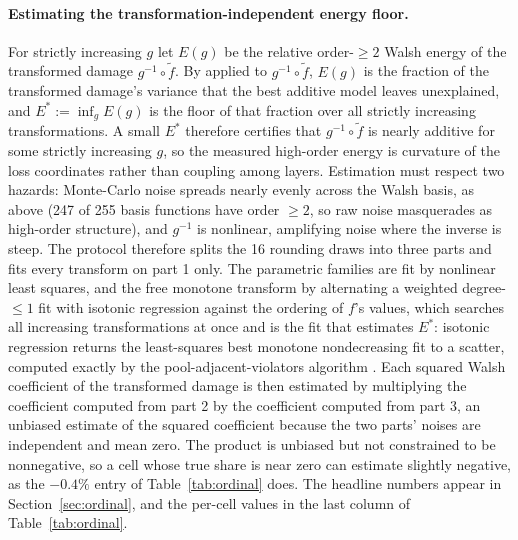 \paragraph{Estimating the transformation-independent energy floor.} For strictly increasing $g$ let $E(g)$
be the relative order-$\ge 2$ Walsh energy of the transformed damage $g^{-1}\circ \tilde f$. By \thmone{}
applied
to $g^{-1}\circ \tilde f$, $E(g)$ is the fraction of the transformed damage's variance that the best additive
model leaves unexplained, and $E^* := \inf_g E(g)$ is the floor of that fraction over all strictly
increasing transformations. A small $E^*$
therefore certifies that $g^{-1}\circ \tilde f$ is nearly additive for some strictly increasing $g$, so the
measured high-order energy is curvature of the loss coordinates rather than coupling among layers.
Estimation must respect two hazards: Monte-Carlo noise spreads nearly evenly across the Walsh basis, as
above (247 of 255 basis functions have order $\ge 2$, so raw noise masquerades as high-order structure),
and $g^{-1}$ is nonlinear, amplifying noise where the inverse is steep. The protocol therefore
splits the 16 rounding draws into three parts and fits every transform on part 1 only. The parametric
families are fit by nonlinear least squares, and the free monotone transform by alternating a weighted
degree-$\le 1$ fit with isotonic regression against the ordering of $f$'s values, which searches all
increasing transformations at once and is the fit that estimates $E^*$: isotonic regression returns the
least-squares best monotone nondecreasing fit to a scatter, computed exactly by the
pool-adjacent-violators algorithm \citep{ayer1955pava,barlow1972isotonic}. Each squared Walsh coefficient of
the transformed damage is then estimated by multiplying the coefficient computed from part 2 by the
coefficient computed from part 3, an unbiased estimate of the squared coefficient because the two parts'
noises are independent and mean zero. The product is unbiased but not constrained to be nonnegative,
so a cell whose true share is near zero can estimate slightly negative, as the $-0.4\%$ entry of
Table~\ref{tab:ordinal} does. The headline numbers appear in Section~\ref{sec:ordinal}, and the
per-cell values in the last column of Table~\ref{tab:ordinal}. 


